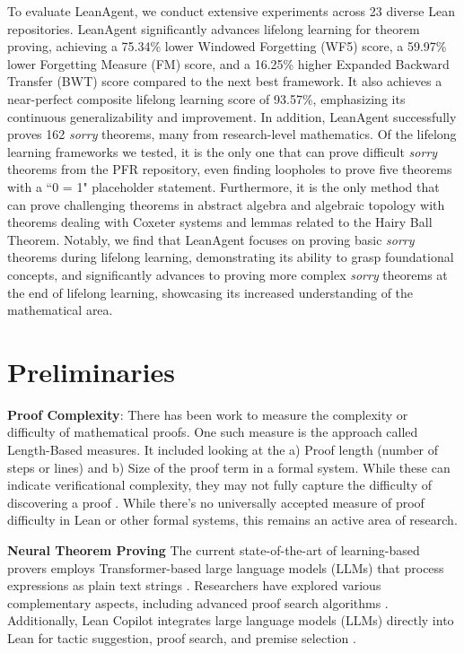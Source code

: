 \documentclass{article} %
\begin{document}
To evaluate LeanAgent, we conduct extensive experiments across 23 diverse Lean repositories. LeanAgent significantly advances lifelong learning for theorem proving, achieving a 75.34\% lower Windowed Forgetting (WF5) score, a 59.97\% lower Forgetting Measure (FM) score, and a 16.25\% higher Expanded Backward Transfer (BWT) score compared to the next best framework. It also achieves a near-perfect composite lifelong learning score of 93.57\%, emphasizing its continuous generalizability and improvement. In addition, LeanAgent successfully proves 162 \textit{sorry} theorems, many from research-level mathematics. Of the lifelong learning frameworks we tested, it is the only one that can prove difficult \textit{sorry} theorems from the PFR repository, even finding loopholes to prove five theorems with a ``0 = 1" placeholder statement. Furthermore, it is the only method that can prove challenging theorems in abstract algebra and algebraic topology with theorems dealing with Coxeter systems and lemmas related to the Hairy Ball Theorem. Notably, we find that LeanAgent focuses on proving basic \textit{sorry} theorems during lifelong learning, demonstrating its ability to grasp foundational concepts, and significantly advances to proving more complex \textit{sorry} theorems at the end of lifelong learning, showcasing its increased understanding of the mathematical area.

\section{Preliminaries}

\textbf{Proof Complexity}: There has been work to measure the complexity or difficulty of mathematical proofs. One such measure is the approach called Length-Based measures. It included looking at the a) Proof length (number of steps or lines) and b) Size of the proof term in a formal system. While these can indicate verificational complexity, they may not fully capture the difficulty of discovering a proof \citep{Arana2023-ARAOTD-3}. While there's no universally accepted measure of proof difficulty in Lean or other formal systems, this remains an active area of research. 

\textbf{Neural Theorem Proving} The current state-of-the-art of learning-based provers employs Transformer-based \citep{vaswaniAttentionAllYou2017a} large language models (LLMs) that process expressions as plain text strings \citep{poluGenerativeLanguageModeling2020}. Researchers have explored various complementary aspects, including advanced proof search algorithms \citep{lampleHyperTreeProofSearch, wangDTSolverAutomatedTheorem2023}. Additionally, Lean Copilot integrates large language models (LLMs) directly into Lean for tactic suggestion, proof search, and premise selection \citep{songLargeLanguageModels2024}.
\end{document}
